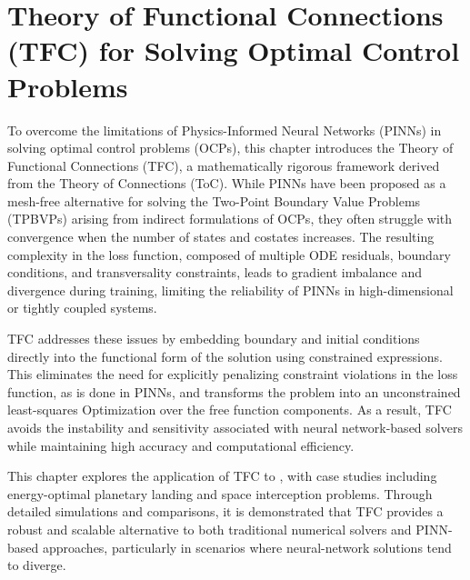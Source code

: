 
\chapter{Theory of Functional Connections (TFC) for Solving Optimal Control Problems}

\ifpdf
    \graphicspath{{Chapter4/Figs/Raster/}{Chapter4/Figs/PDF/}{Chapter4/Figs/}}
\else
    \graphicspath{{Chapter4/Figs/Vector/}{Chapter4/Figs/}}
\fi

To overcome the limitations of Physics-Informed Neural Networks (PINNs) in solving optimal control problems (OCPs), this chapter introduces the Theory of Functional Connections \cite{mortari2017least} (TFC), a mathematically rigorous framework derived from the Theory of Connections (ToC). While PINNs have been proposed as a mesh-free alternative for solving the Two-Point Boundary Value Problems (TPBVPs) arising from indirect formulations of OCPs, they often struggle with convergence when the number of states and costates increases. The resulting complexity in the loss function, composed of multiple ODE residuals, boundary conditions, and transversality constraints, leads to gradient imbalance and divergence during training, limiting the reliability of PINNs in high-dimensional or tightly coupled systems.

TFC addresses these issues by embedding boundary and initial conditions directly into the functional form of the solution using constrained expressions. This eliminates the need for explicitly penalizing constraint violations in the loss function, as is done in PINNs, and transforms the problem into an unconstrained least-squares Optimization over the free function components. As a result, TFC avoids the instability and sensitivity associated with neural network-based solvers while maintaining high accuracy and computational efficiency.

This chapter explores the application of TFC to  \cite{furfaro2020least}, with case studies including energy-optimal planetary landing and space interception problems. Through detailed simulations and comparisons, it is demonstrated that TFC provides a robust and scalable alternative to both traditional numerical solvers and PINN-based approaches, particularly in scenarios where neural-network solutions tend to diverge.

